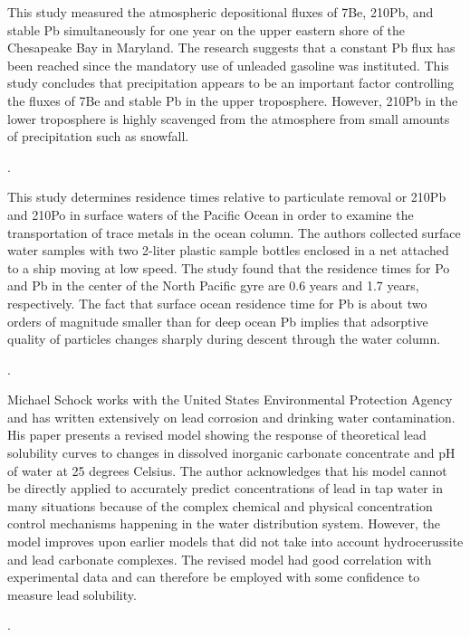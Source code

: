 \documentclass{article}
\begin{document}
This study measured the atmospheric depositional fluxes of 7Be, 210Pb, and stable Pb simultaneously for one year on the upper eastern shore of the Chesapeake Bay in Maryland. The research suggests that a constant Pb flux has been reached since the mandatory use of unleaded gasoline was instituted. This study concludes that precipitation appears to be an important factor controlling the fluxes of 7Be and stable Pb in the upper troposphere. However, 210Pb in the lower troposphere is highly scavenged from the atmosphere from small amounts of precipitation such as snowfall. 

\medskip
\noindent {}.
\medskip

This study determines residence times relative to particulate removal or 210Pb and 210Po in surface waters of the Pacific Ocean in order to examine the transportation of trace metals in the ocean column. The authors collected surface water samples with two 2-liter plastic sample bottles enclosed in a net attached to a ship moving at low speed. The study found that the residence times for Po and Pb in the center of the North Pacific gyre are 0.6 years and 1.7 years, respectively. The fact that surface ocean residence time for Pb is about two orders of magnitude smaller than for deep ocean Pb implies that adsorptive quality of particles changes sharply during descent through the water column.

\medskip
\noindent {}.
\medskip

Michael Schock works with the United States Environmental Protection Agency and has written extensively on lead corrosion and drinking water contamination. His paper presents a revised model showing the response of theoretical lead solubility curves to changes in dissolved inorganic carbonate concentrate and pH of water at 25 degrees Celsius. The author acknowledges that his model cannot be directly applied to accurately predict concentrations of lead in tap water in many situations because of the complex chemical and physical concentration control mechanisms happening in the water distribution system. However, the model improves upon earlier models that did not take into account hydrocerussite and lead carbonate complexes. The revised model had good correlation with experimental data and can therefore be employed with some confidence to measure lead solubility.

\medskip
\noindent {}.
\medskip
\end{document}
